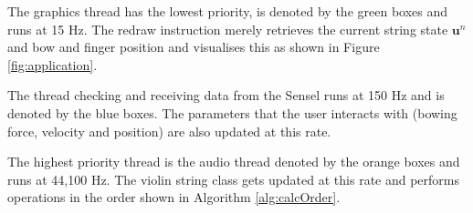     The graphics thread has the lowest priority, is denoted by the green boxes and runs at 15 Hz. The redraw instruction merely retrieves the current string state $\mathbf{u}^n$ and bow and finger position and visualises this as shown in Figure \ref{fig:application}.
    
    The thread checking and receiving data from the Sensel runs at 150 Hz and is denoted by the blue boxes. The parameters that the user interacts with (bowing force, velocity and position) are also updated at this rate.
    
    The highest priority thread is the audio thread denoted by the orange boxes and runs at 44,100 Hz. The violin string class gets updated at this rate and performs operations in the order shown in Algorithm \ref{alg:calcOrder}.
    
